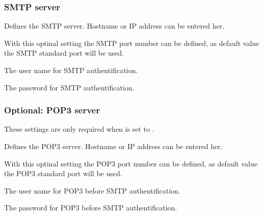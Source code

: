 \subsubsection {SMTP server}
\begin {description}

    
    Defines the SMTP server. Hostname or IP address can be entered her.
            
    
    With this optinal setting the SMTP port number can be defined,
    as default value the  SMTP standard port  will be used.
    
    
    The user name for SMTP authentification.
                
    
    The password for SMTP authentification.

\end {description}

\subsubsection {Optional: POP3 server}

    These settings are only required when 
     is set to . 

\begin {description}

    Defines the POP3 server. Hostname or IP address can be entered her.
            
    
    With this optinal setting the POP3 port number can be defined,
    as default value the  POP3 standard port  will be used.
    
    
    The user name for POP3 before SMTP authentification.
    
    
    The password for POP3 before SMTP authentification.

\end {description}

